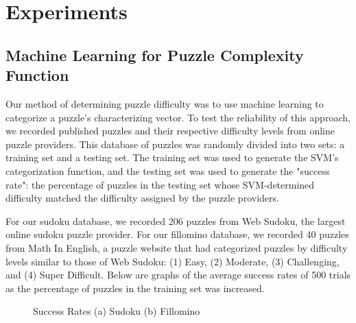 \section{Experiments}

\subsection{Machine Learning for Puzzle Complexity Function}

Our method of determining puzzle difficulty was to use machine learning to categorize a puzzle's characterizing vector. To test the reliability of this approach, we recorded published puzzles and their respective difficulty levels from online puzzle providers. This database of puzzles was randomly divided into two sets: a training set and a testing set. The training set was used to generate the SVM's categorization function, and the testing set was used to generate the "success rate": the percentage of puzzles in the testing set whose SVM-determined difficulty matched the difficulty assigned by the puzzle providers. 

For our sudoku database, we recorded 206 puzzles from Web Sudoku, the largest online sudoku puzzle provider. For our fillomino database, we recorded 40 puzzles from Math In English, a puzzle website that had categorized puzzles by difficulty levels similar to those of Web Sudoku: (1) Easy, (2) Moderate, (3) Challenging, and (4) Super Difficult. Below are graphs of the average success rates of 500 trials as the percentage of puzzles in the training set was increased.  

\begin{figure}
     \centering
     \caption{Success Rates (a) Sudoku (b) Fillomino}
\end{figure}

